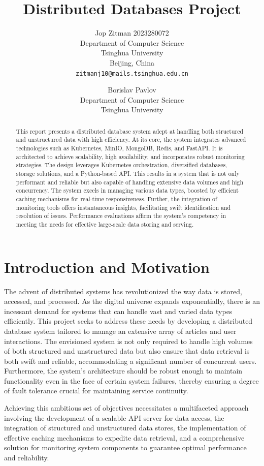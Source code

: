 \documentclass{report}
\title{Distributed Databases Project}
\author{
    Jop Zitman 2023280072\\
    Department of Computer Science\\
    Tsinghua University\\
    Beijing, China \\
    \texttt{zitmanj10@mails.tsinghua.edu.cn}
    \and
    Borislav Pavlov\\
    Department of Computer Science\\
    Tsinghua University\\
    \texttt{}
}
\begin{document}
    \maketitle

    \begin{abstract}
        This report presents a distributed database system adept at handling both structured and unstructured data with high efficiency. At its core, the system integrates advanced technologies such as Kubernetes, MinIO, MongoDB, Redis, and FastAPI. It is architected to achieve scalability, high availability, and incorporates robust monitoring strategies. The design leverages Kubernetes orchestration, diversified databases, storage solutions, and a Python-based API. This results in a system that is not only performant and reliable but also capable of handling extensive data volumes and high concurrency. The system excels in managing various data types, boosted by efficient caching mechanisms for real-time responsiveness. Further, the integration of monitoring tools offers instantaneous insights, facilitating swift identification and resolution of issues. Performance evaluations affirm the system's competency in meeting the needs for effective large-scale data storing and serving.
    \end{abstract}

    \tableofcontents
    \pagebreak

    \section{Introduction and Motivation}
    The advent of distributed systems has revolutionized the way data is stored, accessed, and processed. As the digital universe expands exponentially, there is an incessant demand for systems that can handle vast and varied data types efficiently. This project seeks to address these needs by developing a distributed database system tailored to manage an extensive array of articles and user interactions. The envisioned system is not only required to handle high volumes of both structured and unstructured data but also ensure that data retrieval is both swift and reliable, accommodating a significant number of concurrent users. Furthermore, the system's architecture should be robust enough to maintain functionality even in the face of certain system failures, thereby ensuring a degree of fault tolerance crucial for maintaining service continuity.

    Achieving this ambitious set of objectives necessitates a multifaceted approach involving the development of a scalable API server for data access, the integration of structured and unstructured data stores, the implementation of effective caching mechanisms to expedite data retrieval, and a comprehensive solution for monitoring system components to guarantee optimal performance and reliability.
\end{document}
